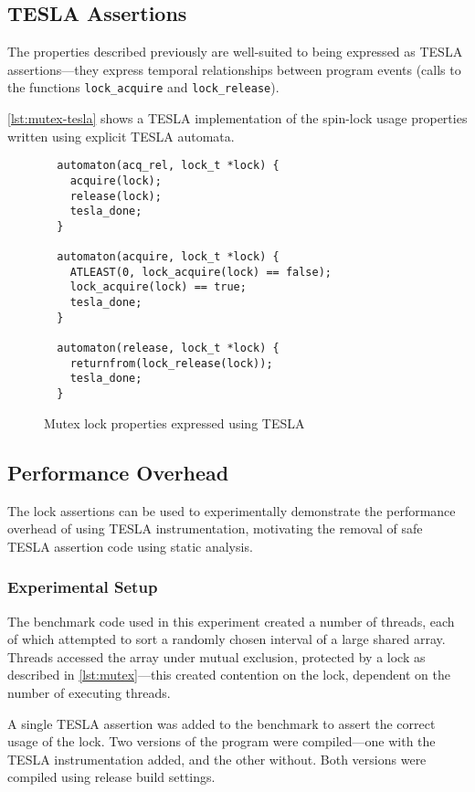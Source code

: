 \subsection{TESLA Assertions}

The properties described previously are well-suited to being expressed as TESLA
assertions---they express temporal relationships between program events (calls
to the functions \texttt{lock_acquire} and \texttt{lock_release}).

\autoref{lst:mutex-tesla} shows a TESLA implementation of the spin-lock
usage properties written using explicit TESLA automata.
\begin{figure}
  \begin{verbatim}
  automaton(acq_rel, lock_t *lock) {
    acquire(lock);
    release(lock);
    tesla_done;
  }

  automaton(acquire, lock_t *lock) {
    ATLEAST(0, lock_acquire(lock) == false);
    lock_acquire(lock) == true;
    tesla_done;
  }

  automaton(release, lock_t *lock) {
    returnfrom(lock_release(lock));
    tesla_done;
  }
  \end{verbatim}
  \caption{Mutex lock properties expressed using TESLA}
  \label{lst:mutex-tesla}
\end{figure}

\subsection{Performance Overhead}

The lock assertions can be used to experimentally demonstrate the performance
overhead of using TESLA instrumentation, motivating the removal of safe TESLA
assertion code using static analysis.

\subsubsection{Experimental Setup}

The benchmark code used in this experiment created a number of
threads, each of which attempted to sort a randomly chosen interval of a
large shared array. Threads accessed the array under mutual exclusion,
protected by a lock as described in \autoref{lst:mutex}---this created
contention on the lock, dependent on the number of executing threads.

A single TESLA assertion was added to the benchmark to assert the correct usage
of the lock. Two versions of the program were compiled---one with the TESLA
instrumentation added, and the other without. Both versions were compiled using
release build settings.

